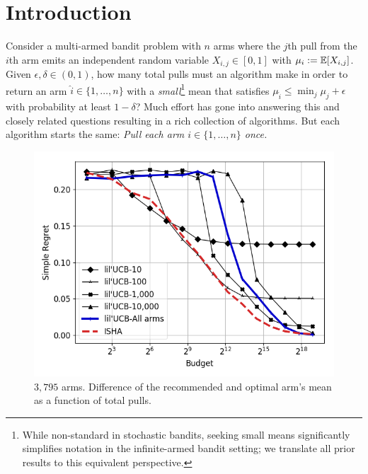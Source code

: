 
\section{Introduction}\label{intro}
Consider a multi-armed bandit problem with $n$ arms where the $j$th pull from the $i$th arm emits an independent random variable $X_{i,j} \in [0,1]$ with $\mu_i:=\mathbb{E}[X_{i,j}]$. 
Given $\epsilon,\delta \in (0,1)$, how many total pulls must an algorithm make in order to return an arm $\widehat{i} \in \{1,\dots,n\}$ with a \emph{small}\footnote{While non-standard in stochastic bandits, seeking small means significantly simplifies notation in the infinite-armed bandit setting; we translate all prior results to this equivalent perspective.} mean that satisfies $\mu_{\widehat{i}} \leq \displaystyle\min_{j} \mu_j + \epsilon$ with probability at least $1-\delta$?
Much effort has gone into answering this and closely related questions resulting in a rich collection of algorithms.
But each algorithm starts the same:  \textit{Pull each arm $i \in \{1,\dots,n\}$ once.}

%
%
\begin{figure}
\includegraphics[width=.45\textwidth]{fixedbudget/figures/folder5/new_yorker.png}
\caption{$3,795$ arms. Difference of the recommended and optimal arm's mean as a function of total pulls. }
\label{fig:newyorker}
\vspace{-1.5em}
\end{figure}
%
%

